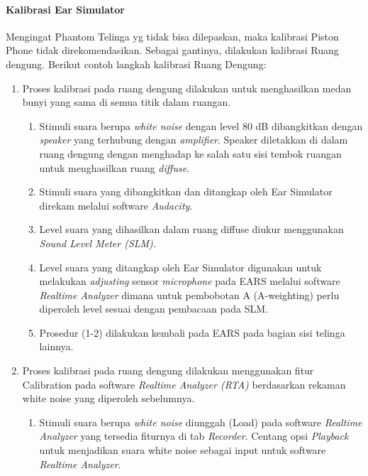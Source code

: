 \documentclass{article}
\begin{document}
	\paragraph{Kalibrasi Ear Simulator}

	Mengingat Phantom Telinga yg tidak bisa dilepaskan, maka kalibrasi Piston Phone tidak direkomendasikan.
	Sebagai gantinya, dilakukan kalibrasi Ruang dengung.
	Berikut contoh langkah kalibrasi Ruang Dengung:

	\begin{enumerate}
		\item Proses kalibrasi pada ruang dengung dilakukan untuk menghasilkan medan bunyi yang sama di semua titik dalam ruangan.
		
		\begin{enumerate}
			\item Stimuli suara berupa \textit{white noise} dengan level 80 dB dibangkitkan dengan \textit{speaker} yang terhubung dengan \textit{amplifier}. Speaker diletakkan di dalam ruang dengung dengan
			menghadap ke salah satu sisi tembok ruangan untuk menghasilkan ruang \textit{diffuse}.
			
			\item Stimuli suara yang dibangkitkan dan ditangkap oleh Ear Simulator direkam melalui software \textit{Audacity}.
			
			\item Level suara yang dihasilkan dalam ruang diffuse diukur menggunakan \textit{Sound Level Meter (SLM)}.
			
			\item Level suara yang ditangkap oleh Ear Simulator digunakan untuk melakukan \textit{adjusting} sensor \textit{microphone} pada EARS melalui software \textit{Realtime Analyzer} dimana untuk pembobotan A
			(A-weighting) perlu diperoleh level sesuai dengan pembacaan pada SLM.
			
			\item Prosedur (1-2) dilakukan kembali pada EARS pada bagian sisi telinga lainnya.
		\end{enumerate}
	
		\item Proses kalibrasi pada ruang dengung dilakukan menggunakan fitur Calibration pada software \textit{Realtime Analyzer (RTA)} berdasarkan rekaman white noise yang diperoleh sebelumnya.
		
		\begin{enumerate}
			\item Stimuli suara berupa \textit{white noise} diunggah (Load) pada software \textit{Realtime Analyzer} yang tersedia fiturnya di tab \textit{Recorder}.
			Centang opsi \textit{Playback} untuk menjadikan suara white noise sebagai input untuk software \textit{Realtime Analyzer}.
			

\end{enumerate}
\end{enumerate}
\end{document}
